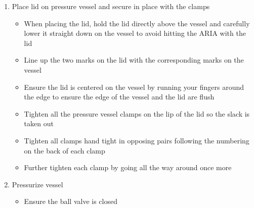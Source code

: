 \documentclass[letterpaper,11pt]{article}
\begin{document}
\begin{enumerate}
	\item Place lid on pressure vessel and secure in place with the 
        clamps %
		\begin{itemize}
        \item When placing the lid, hold the lid directly above the vessel and 
            carefully lower it straight down on the vessel to avoid hitting the
            ARIA with the lid
        \item Line up the two marks on the lid with the corresponding marks 
            on the vessel
        \item Ensure the lid is centered on the vessel by running your fingers
            around the edge to ensure the edge of the vessel and the lid are
            flush 
		\item Tighten all the pressure vessel clamps on the lip of the lid so 
            the slack is taken out
        \item Tighten all clamps hand tight in opposing pairs following the 
            numbering on the back of each clamp
        \item Further tighten each clamp by going all the way around once more
		\end{itemize}
		
	\item Pressurize vessel
		\begin{itemize}
        \item Ensure the ball valve is closed
       

\end{itemize}
\end{enumerate}
\end{document}
